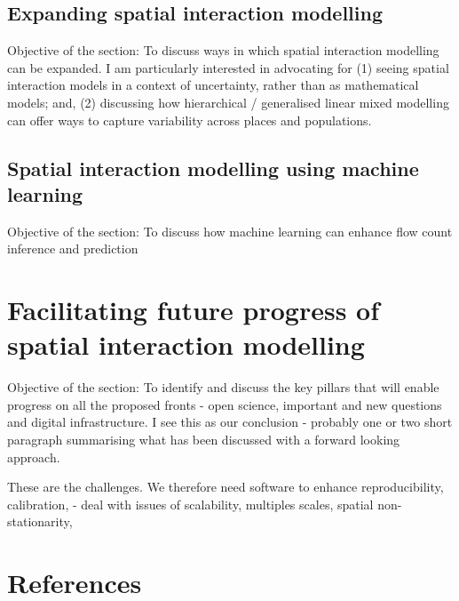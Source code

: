 \documentclass[11pt,letterpaper]{article}
\begin{document}
\hypertarget{expanding-spatial-interaction-modelling}{%
\subsection{Expanding spatial interaction modelling}\label{expanding-spatial-interaction-modelling}}

Objective of the section: To discuss ways in which spatial interaction modelling can be expanded.
I am particularly interested in advocating for (1) seeing spatial interaction models in a context of uncertainty, rather than as mathematical models; and, (2) discussing how hierarchical / generalised linear mixed modelling can offer ways to capture variability across places and populations.

\hypertarget{spatial-interaction-modelling-using-machine-learning}{%
\subsection{Spatial interaction modelling using machine learning}\label{spatial-interaction-modelling-using-machine-learning}}

Objective of the section: To discuss how machine learning can enhance flow count inference and prediction

\hypertarget{facilitating-future-progress-of-spatial-interaction-modelling}{%
\section{Facilitating future progress of spatial interaction modelling}\label{facilitating-future-progress-of-spatial-interaction-modelling}}

Objective of the section: To identify and discuss the key pillars that will enable progress on all the proposed fronts - open science, important and new questions and digital infrastructure.
I see this as our conclusion - probably one or two short paragraph summarising what has been discussed with a forward looking approach.

These are the challenges.
We therefore need software to enhance reproducibility, calibration, - deal with issues of scalability, multiples scales, spatial non-stationarity,

\hypertarget{references}{%
\section*{References}\label{references}}
\end{document}
